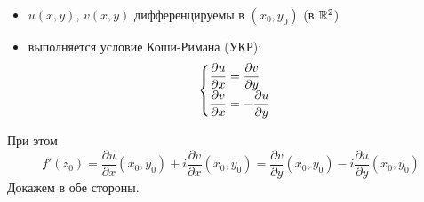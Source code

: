 \begin{itemize}
    \item $u(x,y)$, $v(x,y)$ дифференцируемы в $(x_0,y_0)$ (в $\mathbb{R}^2$)
    \item выполняется условие Коши-Римана (УКР):
    \begin{equation}\label{(3.6)}
        \begin{cases}
            \displaystyle \frac{\partial u}{\partial x} = \displaystyle \frac{\partial v}{\partial y} \\
            \displaystyle \frac{\partial v}{\partial x} = - \displaystyle \frac{\partial u}{\partial y}
        \end{cases}
    \end{equation}
\end{itemize}
При этом
\begin{equation}\label{(3.7)}
    f'(z_0) = \frac{\partial u}{\partial x}(x_0,y_0) + i\frac{\partial v}{\partial x}(x_0,y_0) = \frac{\partial v}{\partial y}(x_0,y_0) - i\frac{\partial u}{\partial y}(x_0,y_0)
\end{equation}
\pr
Докажем в обе стороны.

